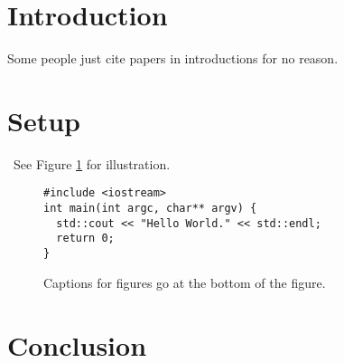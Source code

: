 \section{Introduction}
Some people just cite papers in introductions for no reason.

\section{Setup}
\label{sec:potent-outc-fram}
\blindmathtrue\blindtext\ See Figure \ref{fig:figure1} for illustration.
\begin{figure}[ht]
  \centering
\begin{verbatim}
#include <iostream>
int main(int argc, char** argv) {
  std::cout << "Hello World." << std::endl;
  return 0;
}
\end{verbatim}
  \caption{Captions for figures go at the bottom of the figure.}
  \label{fig:figure1}
\end{figure}

\section{Conclusion}
\blindmathfalse\blindtext[2]
